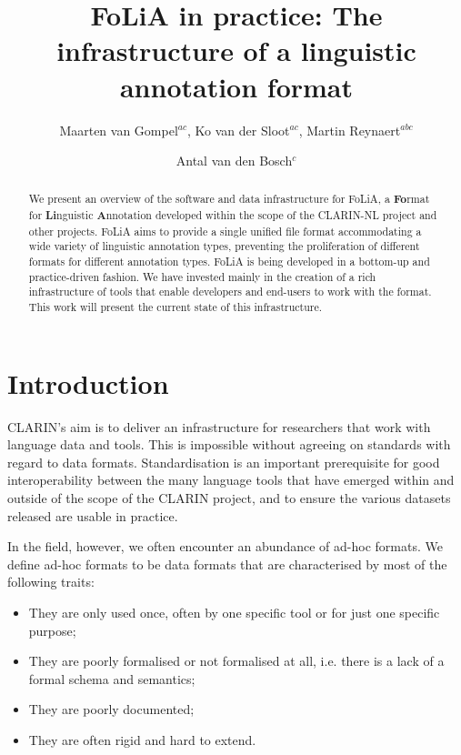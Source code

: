 \documentclass[a4paper,11pt]{article}
\begin{document}
\title{FoLiA in practice: The infrastructure of a linguistic annotation format}
\author{Maarten van Gompel$^{ac}$,  Ko van der
Sloot$^{ac}$, Martin Reynaert$^{abc}$ \and Antal van den Bosch$^c$} %
\date{}


\maketitle
\renewcommand{\thefootnote}{\alph{footnote}}
\renewcommand{\thefootnote}{\arabic{footnote}}

\begin{abstract}
We present an overview of the software and data infrastructure for FoLiA, a
\textbf{Fo}rmat for \textbf{Li}nguistic \textbf{A}nnotation developed within the
scope of the CLARIN-NL project and other projects.  FoLiA aims to provide a
single unified file format accommodating a wide variety of linguistic
annotation types, preventing the proliferation of different formats for
different annotation types. FoLiA is being developed in a bottom-up and
practice-driven fashion.  We have invested mainly in the creation of a rich
infrastructure of tools that enable developers and end-users to work with the
format. This work will present the current state of this infrastructure.
\end{abstract}


\section{Introduction}

CLARIN's aim is to deliver an infrastructure for researchers that work with
language data and tools. This is impossible without agreeing on standards with
regard to data formats. Standardisation is an important prerequisite for good
interoperability between the many language tools that have emerged within and
outside of the scope of the CLARIN project, and to ensure the various datasets
released are usable in practice.

In the field, however, we often encounter an abundance of ad-hoc formats. We
define ad-hoc formats to be data formats that are characterised by most of the
following traits:

\begin{itemize}
    \item They are only used once, often by one specific tool or for just one specific purpose;
    \item They are poorly formalised or not formalised at all, i.e. there is a lack of a formal schema and semantics;
    \item They are poorly documented;
    \item They are often rigid and hard to extend.
\end{itemize}
\end{document}

